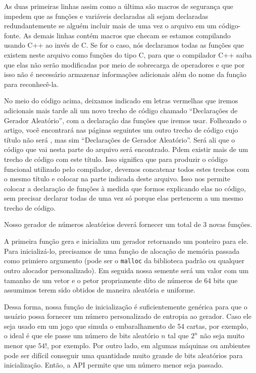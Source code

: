 As duas primeiras linhas assim como a última são macros de segurança
que impedem que as funções e variáveis declaradas ali sejam declaradas
redundantemente se alguém incluir mais de uma vez o arquivo em um
código-fonte. As demais linhas contém macros que checam se estamos
compilando usando C++ ao invés de C. Se for o caso, nós declaramos
todas as funções que existem neste arquivo como funções do tipo C,
para que o compilador C++ saiba que elas não serão modificadas por
meio de sobrecarga de operadores e que por isso não é necessário
armazenar informações adicionais além do nome da função para
reconhecê-la.

No meio do código acima, deixamos indicado em letras vermelhas que
iremos adicionais mais tarde ali um novo trecho de código chamado
``Declarações de Gerador Aleatório'', com a declaração das funções que
iremos usar. Folheando o artigo, você encontrará nas páginas seguintes
um outro trecho de código cujo título não será ,
mas sim ``Declarações de Gerador Aleatório''. Será ali que o código que
vai nesta parte do arquivo será encontrado. Pdem existir mais de um
trecho de código com este título. Isso significa que para produzir o
código funcional utilizado pelo compilador, devemos concatenar todos
estes trechos com o mesmo título e colocar na parte indicada deste
arquivo. Isso nos permite colocar a declaração de funções à medida que
formos explicando elas no código, sem precisar declarar todas de uma
vez só porque elas pertencem a um mesmo trecho de código.


Nosso gerador de números aleatórios deverá fornecer um total de 3
novas funções.

A primeira função gera e inicializa um gerador retornando um ponteiro
para ele. Para inicializá-lo, precisamos de uma função de alocação de
memória passada como primiero argumento (pode ser o \texttt{malloc} da
biblioteca padrão ou qualquer outro alocador personalizado). Em
seguida nossa semente será um valor com um tamanho de um vetor e o
petor propriamente dito de números de 64 bits que assumimos terem sido
obtidos de maneira aleatória e uniforme.

Dessa forma, nossa função de inicialização é suficientemente genérica
para que o usuário possa fornecer um número personalizado de entropia
ao gerador. Caso ele seja usado em um jogo que simula o embaralhamento
de 54 cartas, por exemplo, o ideal é que ele passe um número de bits
aleatório $n$ tal que $2^n$ não seja muito menor que $54!$, por
exemplo. Por outro lado, em algumas máquinas ou ambientes pode ser
difícil conseguir uma quantidade muito grande de bits aleatórios para
inicialização. Então, a API permite que um número menor seja passado.

